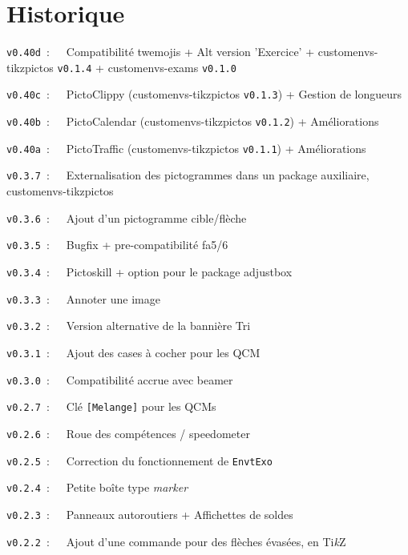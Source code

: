 \documentclass[french,11pt,a4paper]{article}
\providecommand\tikzlogo{Ti\textit{k}Z}
\let\TikZ\tikzlogo
\begin{document}

\hypertarget{matoc}{}

\tableofcontents

\vspace*{5mm}

\pagebreak

\section{Historique}

\verb|v0.40d|~:~~~Compatibilité \textsf{twemojis} + \textsf{Alt} version 'Exercice' + \textsf{customenvs-tikzpictos} \texttt{v0.1.4} + \textsf{customenvs-exams} \texttt{v0.1.0}

\verb|v0.40c|~:~~~PictoClippy (\textsf{customenvs-tikzpictos} \texttt{v0.1.3}) + Gestion de longueurs

\verb|v0.40b|~:~~~PictoCalendar (\textsf{customenvs-tikzpictos} \texttt{v0.1.2}) + Améliorations

\verb|v0.40a|~:~~~PictoTraffic (\textsf{customenvs-tikzpictos} \texttt{v0.1.1}) + Améliorations

\verb|v0.3.7|~:~~~Externalisation des pictogrammes dans un package auxiliaire, \textsf{customenvs-tikzpictos}

\verb|v0.3.6|~:~~~Ajout d'un pictogramme \textsf{cible/flèche}

\verb|v0.3.5|~:~~~Bugfix + pre-compatibilité \textsf{fa5/6}

\verb|v0.3.4|~:~~~Pictoskill + option pour le package \textsf{adjustbox}

\verb|v0.3.3|~:~~~Annoter une image

\verb|v0.3.2|~:~~~Version alternative de la bannière \textsf{Tri}

\verb|v0.3.1|~:~~~Ajout des cases à cocher pour les \textsf{QCM}

\verb|v0.3.0|~:~~~Compatibilité accrue avec \textsf{beamer}

\verb|v0.2.7|~:~~~Clé \texttt{[Melange]} pour les QCMs

\verb|v0.2.6|~:~~~Roue des compétences / speedometer

\verb|v0.2.5|~:~~~Correction du fonctionnement de \texttt{EnvtExo}

\verb|v0.2.4|~:~~~Petite boîte type \textit{marker}

\verb|v0.2.3|~:~~~Panneaux autoroutiers + Affichettes de soldes

\verb|v0.2.2|~:~~~Ajout d'une commande pour des flèches évasées, en \TikZ\
\end{document}
